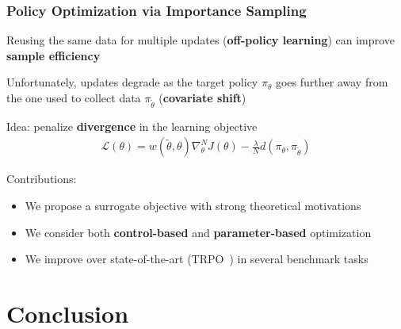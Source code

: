 \documentclass{beamer}
\begin{document}
\begin{frame}
\frametitle{Policy Optimization via Importance Sampling}
Reusing the same data for multiple updates (\textbf{off-policy learning}) can improve \textbf{sample efficiency}

\vfill

Unfortunately, updates degrade as the target policy $\pi_{\theta}$ goes further away from the one used to collect data $\pi_{\tilde{\theta}}$ (\textbf{covariate shift})

\vfill

Idea: penalize \textbf{divergence} in the learning objective
\begin{align*}
	\mathcal{L}(\theta) = w(\widetilde{\theta},\theta)\nabla_{\theta}^NJ(\theta) - \frac{\lambda}{N}d(\pi_{\theta}, \pi_{\tilde{\theta}})
\end{align*}

Contributions:
\begin{itemize}
	\item We propose a surrogate objective with strong theoretical motivations
	\item We consider both \textbf{control-based} and \textbf{parameter-based} optimization
	\item We improve over state-of-the-art (TRPO~\cite{schulman2015trust}) in several benchmark tasks
\end{itemize}

\end{frame}

\section{Conclusion}
\end{document}
